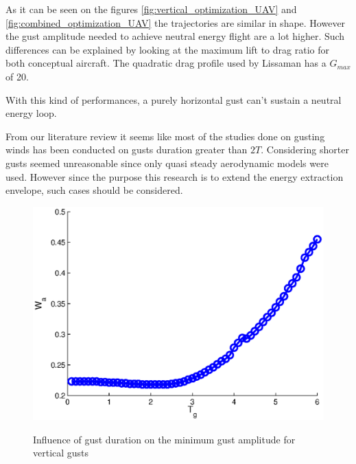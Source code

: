 As it can be seen on the figures \ref{fig:vertical_optimization_UAV} and \ref{fig:combined_optimization_UAV} the trajectories are similar in shape. However the gust amplitude needed to achieve neutral energy flight are a lot higher.
Such differences can be explained by looking at the maximum lift to drag ratio for both conceptual aircraft.
The quadratic drag profile used by Lissaman has a $G_{max}$ of 20.

\FloatBarrier

\par With this kind of performances, a purely horizontal gust can't sustain a neutral energy loop.

\FloatBarrier

%



From our literature review it seems like most of the studies done on gusting winds has been conducted on gusts duration greater than $2T$.
Considering shorter gusts seemed unreasonable since only quasi steady aerodynamic models were used. 
However since the purpose this research is to extend the energy extraction envelope, such cases should be considered.

\begin{figure}[h!]
  \begin{center}
    \scalebox{1.0}
    {\includegraphics{./Figures/Wg_vs_TG_windtype=1_alhpamax=12_nodalphalimit.eps}}
  \end{center}
  \caption{Influence of gust duration on the minimum gust amplitude for vertical gusts}
  \label{fig:vertical_amplitude_duration}
\end{figure}

